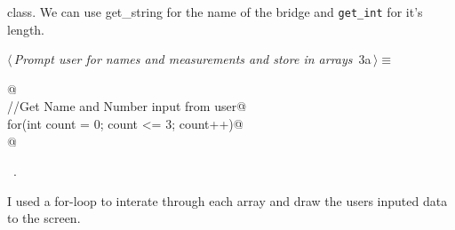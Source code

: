 \documentclass{article}
\begin{document}
class. We can use get\_string for the name of the bridge and \verb|get_int| 
for it's length.
\begin{flushleft} \small
\begin{minipage}{\linewidth}\label{scrap3}\raggedright\small
{} $\langle\,${\it Prompt user for names and measurements and store in arrays}\nobreak\ {\footnotesize {3a}}$\,\rangle\equiv$
\vspace{-1ex}
\begin{list}{}{} \item
\mbox{}\verb@        @\\
\mbox{}\verb@        //Get Name and Number input from user@\\
\mbox{}\verb@        for(int count = 0; count <= 3; count++)@\\
\mbox{}@\\
\mbox{}\verb@@{\NWsep}
\end{list}
\vspace{-1.5ex}
\footnotesize
\begin{list}{}{\setlength{\itemsep}{-\parsep}\setlength{\itemindent}{-\leftmargin}}
\item \NWtxtMacroRefIn\ .

\item{}
\end{list}
\end{minipage}\vspace{4ex}
\end{flushleft}
I used a for-loop to interate through each array and draw the
users inputed data to the screen.
\end{document}
